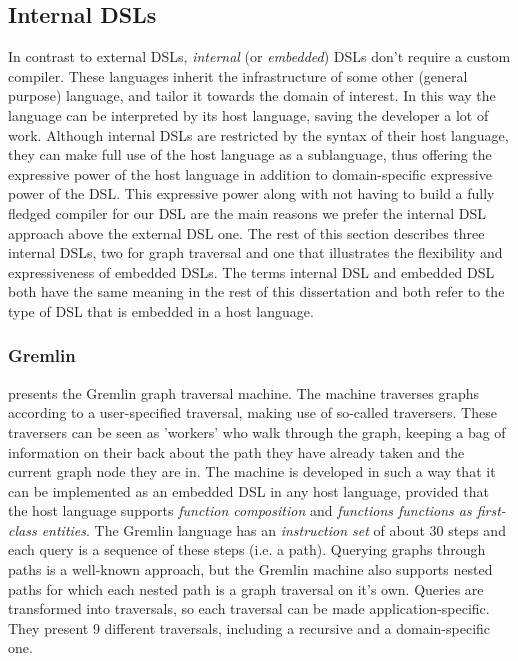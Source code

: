 

\subsection{Internal DSLs}

In contrast to external DSLs, \textit{internal} (or \textit{embedded}\cite{Hudak:1996}) DSLs don't require a custom compiler. These languages inherit the infrastructure of some other (general purpose) language, and tailor it towards the domain of interest. In this way the language can be interpreted by its host language, saving the developer a lot of work. Although internal DSLs are restricted by the syntax of their host language, they can make full use of the host language as a sublanguage, thus offering the expressive power of the host language in addition to domain-specific expressive power of the DSL. This expressive power along with not having to build a fully fledged compiler for our DSL are the main reasons we prefer the internal DSL approach above the external DSL one. The rest of this section describes three internal DSLs, two for graph traversal and one that illustrates the flexibility and expressiveness of embedded DSLs. The terms internal DSL and embedded DSL both have the same meaning in the rest of this dissertation and both refer to the type of DSL that is embedded in a host language.

\subsubsection*{Gremlin}
\cite{Gremlin} presents the Gremlin graph traversal machine. The machine traverses graphs according to a user-specified traversal, making use of so-called traversers. These traversers can be seen as 'workers' who walk through the graph, keeping a bag of information on their back about the path they have already taken and the current graph node they are in. The machine is developed in such a way that it can be implemented as an embedded DSL in any host language, provided that the host language supports \textit{function composition} and \textit{functions functions as first-class entities}. The Gremlin language has an \textit{instruction set} of about 30 steps and each query is a sequence of these steps (i.e. a path). Querying graphs through paths is a well-known approach, but the Gremlin machine also supports nested paths for which each nested path is a graph traversal on it's own. Queries are transformed into traversals, so each traversal can be made application-specific. They present 9 different traversals, including a recursive and a domain-specific one. 


